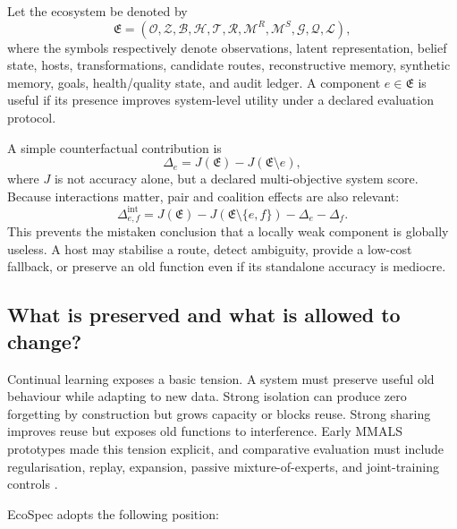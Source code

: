 \documentclass[10pt]{article}
\newcommand{\M}{\mathcal{M}}
\newcommand{\Rset}{\mathcal{R}}
\newcommand{\Hset}{\mathcal{H}}
\begin{document}
Let the ecosystem be denoted by
\begin{equation}
  \mathfrak{E} = (\mathcal{O},\mathcal{Z},\mathcal{B},\Hset,\mathcal{T},\Rset,\M^R,\M^S,\mathcal{G},\mathcal{Q},\mathcal{L}),
  \label{eq:ecosystem}
\end{equation}
where the symbols respectively denote observations, latent representation, belief state, hosts, transformations, candidate routes, reconstructive memory, synthetic memory, goals, health/quality state, and audit ledger. A component $e\in\mathfrak{E}$ is useful if its presence improves system-level utility under a declared evaluation protocol.

A simple counterfactual contribution is
\begin{equation}
  \Delta_e = J(\mathfrak{E}) - J(\mathfrak{E}\setminus e),
  \label{eq:counterfactual}
\end{equation}
where $J$ is not accuracy alone, but a declared multi-objective system score. Because interactions matter, pair and coalition effects are also relevant:
\begin{equation}
  \Delta_{e,f}^{\mathrm{int}} = J(\mathfrak{E})-J(\mathfrak{E}\setminus\{e,f\})-\Delta_e-\Delta_f.
  \label{eq:interaction}
\end{equation}
This prevents the mistaken conclusion that a locally weak component is globally useless. A host may stabilise a route, detect ambiguity, provide a low-cost fallback, or preserve an old function even if its standalone accuracy is mediocre.

\subsection{What is preserved and what is allowed to change?}

Continual learning exposes a basic tension. A system must preserve useful old behaviour while adapting to new data. Strong isolation can produce zero forgetting by construction but grows capacity or blocks reuse. Strong sharing improves reuse but exposes old functions to interference. Early MMALS prototypes made this tension explicit, and comparative evaluation must include regularisation, replay, expansion, passive mixture-of-experts, and joint-training controls \citep{kirkpatrick2017overcoming,zenke2017continual,li2017learning,rebuffi2017icarl,lopez2017gradient,rolnick2019experience,rusu2016progressive,mallya2018packnet,shazeer2017outrageously}.

EcoSpec adopts the following position:
\end{document}

